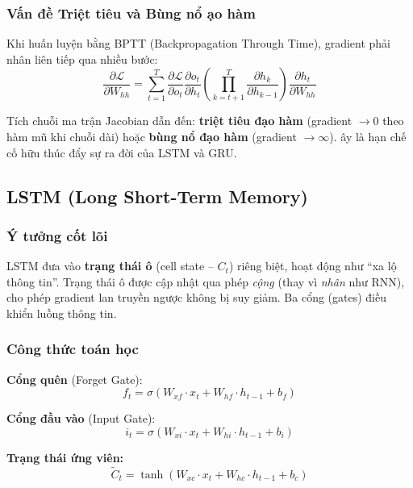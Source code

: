 \documentclass[a4paper]{article}
\theoremstyle{definition}
\begin{document}
\subsubsection{Vấn đề Triệt tiêu và Bùng nổ \DJ ạo hàm}
Khi huấn luyện bằng BPTT (Backpropagation Through Time), gradient phải nhân liên tiếp qua nhiều bước:
\begin{equation}
	\frac{\partial \mathcal{L}}{\partial W_{hh}} = \sum_{t=1}^{T} \frac{\partial \mathcal{L}}{\partial o_t} \frac{\partial o_t}{\partial h_t} \left(\prod_{k=t+1}^{T} \frac{\partial h_k}{\partial h_{k-1}}\right) \frac{\partial h_t}{\partial W_{hh}}
\end{equation}

Tích chuỗi ma trận Jacobian dẫn đến: \textbf{triệt tiêu đạo hàm} (gradient $\to 0$ theo hàm mũ khi chuỗi dài) hoặc \textbf{bùng nổ đạo hàm} (gradient $\to \infty$). \DJ ây là hạn chế cố hữu thúc đẩy sự ra đời của LSTM và GRU.

\subsection{LSTM (Long Short-Term Memory)}

\subsubsection{Ý tưởng cốt lõi}
LSTM \cite{hochreiter1997long} đưa vào \textbf{trạng thái ô} (cell state -- $C_t$) riêng biệt, hoạt động như ``xa lộ thông tin''. Trạng thái ô được cập nhật qua phép \textit{cộng} (thay vì \textit{nhân} như RNN), cho phép gradient lan truyền ngược không bị suy giảm. Ba cổng (gates) điều khiển luồng thông tin.

\subsubsection{Công thức toán học}
\textbf{Cổng quên} (Forget Gate):
\begin{equation}
	f_t = \sigma\left(W_{xf} \cdot x_t + W_{hf} \cdot h_{t-1} + b_f\right)
\end{equation}

\textbf{Cổng đầu vào} (Input Gate):
\begin{equation}
	i_t = \sigma\left(W_{xi} \cdot x_t + W_{hi} \cdot h_{t-1} + b_i\right)
\end{equation}

\textbf{Trạng thái ứng viên:}
\begin{equation}
	\tilde{C}_t = \tanh\left(W_{xc} \cdot x_t + W_{hc} \cdot h_{t-1} + b_c\right)
\end{equation}
\end{document}
